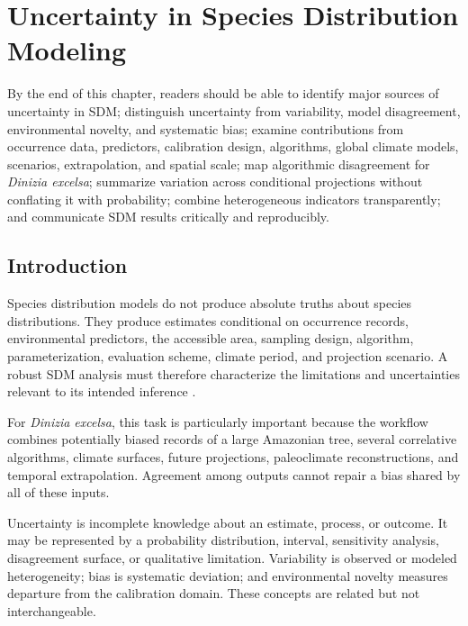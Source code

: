 \chapter[Uncertainty in SDM]{Uncertainty in Species Distribution Modeling}

\begin{objetivos}
By the end of this chapter, readers should be able to identify major sources of uncertainty in SDM; distinguish uncertainty from variability, model disagreement, environmental novelty, and systematic bias; examine contributions from occurrence data, predictors, calibration design, algorithms, global climate models, scenarios, extrapolation, and spatial scale; map algorithmic disagreement for \textit{Dinizia excelsa}; summarize variation across conditional projections without conflating it with probability; combine heterogeneous indicators transparently; and communicate SDM results critically and reproducibly.
\end{objetivos}

\section{Introduction}

Species distribution models do not produce absolute truths about species distributions. They produce estimates conditional on occurrence records, environmental predictors, the accessible area, sampling design, algorithm, parameterization, evaluation scheme, climate period, and projection scenario. A robust SDM analysis must therefore characterize the limitations and uncertainties relevant to its intended inference \parencite{guisan2017habitat,franklin2023,zurell2020benchmarking,yates2018transferability}.

For \textit{Dinizia excelsa}, this task is particularly important because the workflow combines potentially biased records of a large Amazonian tree, several correlative algorithms, climate surfaces, future projections, paleoclimate reconstructions, and temporal extrapolation. Agreement among outputs cannot repair a bias shared by all of these inputs.

\begin{conceito}[title={\faBook\quad Uncertainty in SDM}]
Uncertainty is incomplete knowledge about an estimate, process, or outcome. It may be represented by a probability distribution, interval, sensitivity analysis, disagreement surface, or qualitative limitation. Variability is observed or modeled heterogeneity; bias is systematic deviation; and environmental novelty measures departure from the calibration domain. These concepts are related but not interchangeable.
\end{conceito}

